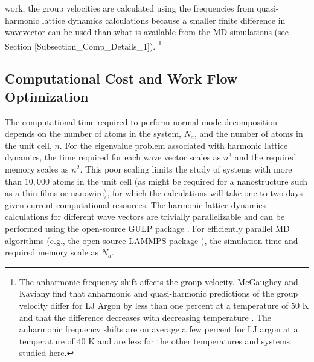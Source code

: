 work, the group 
velocities are calculated using the frequencies from quasi-harmonic 
lattice dynamics 
calculations because a smaller finite difference in wavevector can be used 
than what is 
available from the MD simulations (see Section 
\ref{Subsection_Comp_Details_1}).
\footnote{The anharmonic frequency shift affects the group velocity. 
McGaughey and Kaviany find that anharmonic and quasi-harmonic predictions 
of 
the group velocity differ for LJ Argon by less than one percent at a 
temperature of 
$50$ K and that the difference decreases with decreasing temperature 
\cite{mcgaughey_quantitative_2004}. 
The anharmonic frequency shifts are on average a few percent for LJ argon 
at a temperature 
of $40$ K and are less for the other temperatures and systems studied here.}

\subsection{\label{Subsection_Comp_Details_4}Computational Cost 
and Work Flow Optimization}

The computational time required to perform normal mode decomposition 
depends on the number of atoms in the system, $N_a$, and the number of 
atoms in the unit cell, $n$. 
For the eigenvalue problem associated with 
harmonic lattice dynamics, the time required for each wave vector scales 
as $n^3$ and the required memory scales as $n^2$. This poor scaling limits 
the study of systems with more than $10,000$ atoms in the unit cell (as 
might be required for a nanostructure such as a thin films or nanowire), 
for which the calculations will take one to two days given current 
computational resources. The harmonic lattice dynamics calculations for 
different wave vectors are trivially parallelizable and can be performed 
using the open-source GULP package \cite{gale_general_2003}. For 
efficiently parallel MD algorithms (e.g., the open-source LAMMPS package 
\cite{plimpton_fast_1995}), the simulation time and required memory 
scale as $N_a$.

